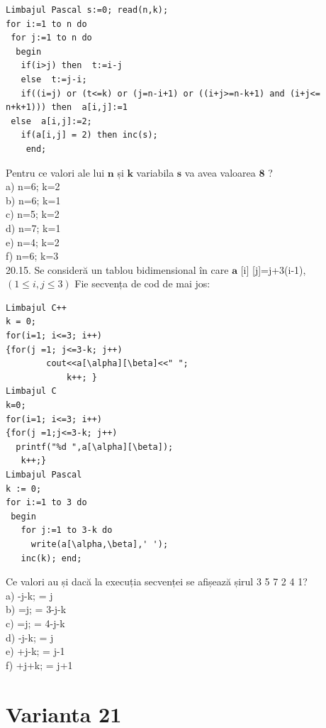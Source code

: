 {{\begin{verbatim}
Limbajul Pascal s:=0; read(n,k); 
for i:=1 to n do 
 for j:=1 to n do 
  begin 
   if(i>j) then  t:=i-j 
   else  t:=j-i; 
   if((i=j) or (t<=k) or (j=n-i+1) or ((i+j>=n-k+1) and (i+j<= 
n+k+1))) then  a[i,j]:=1
 else  a[i,j]:=2; 
   if(a[i,j] = 2) then inc(s); 
    end;
\end{verbatim}
Pentru ce valori ale lui $\mathbf{n}$ și $\mathbf{k}$ variabila $\mathbf{s}$ va avea valoarea $\mathbf{8}$ ?
\\
a) n=6; k=2
\\
b) n=6; k=1
\\
c) n=5; k=2
\\
d)  n=7; k=1
\\
e) n=4;  k=2
\\
f) n=6;  k=3
\\
20.15. Se consideră un tablou bidimensional în care $\mathbf{a}$ [i] [j]=j+3(i-1), $(1 \leq i, j \leq 3)$ Fie secvența de cod de mai jos:
\begin{verbatim}
Limbajul C++
k = 0;
for(i=1; i<=3; i++)
{for(j =1; j<=3-k; j++)
        cout<<a[\alpha][\beta]<<" ";
            k++; }
Limbajul C 
k=0; 
for(i=1; i<=3; i++)  
{for(j =1;j<=3-k; j++)  
  printf("%d ",a[\alpha][\beta]); 
   k++;}
Limbajul Pascal 
k := 0; 
for i:=1 to 3 do 
 begin 
   for j:=1 to 3-k do 
     write(a[\alpha,\beta],' '); 
   inc(k); end;
\end{verbatim}
Ce valori au \alpha și \beta dacă la execuția secvenței se afișează șirul  3 5 7 2 4 1?
\\
a) -j-k;   
\beta= j 
\\
b) \alpha=j; 
 \beta= 3-j-k 
\\
c)  \alpha=j; 
    \beta= 4-j-k 
\\ 
d) -j-k;  
    \beta= j
\\
e) +j-k;  
    \beta= j-1 
\\
f) +j+k;  
    \beta= j+1 
\\

\section*{Varianta 21}

}}
